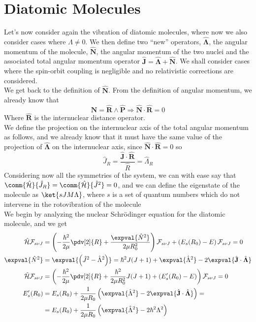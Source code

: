 \documentclass[a4paper, 11pt]{book}
\renewcommand{\vec}[1]{\mathbf{#1}}
\newcommand{\1}{\opr{\mathds{1}}}
\newcommand{\ham}{\mathcal{H}}
\newcommand{\opr}[1]{\hat{#1}}
\newcommand{\vecopr}[1]{\opr{\vec{#1}}}
\theoremstyle{plain}
\begin{document}
	\section{Diatomic Molecules}
	Let's now consider again the vibration of diatomic molecules, where now we also consider cases where $\Lambda\ne0$. We then define two ``new'' operators, $\vecopr{\Lambda}$, the angular momentum of the molecule, $\vecopr{N}$, the angular momentum of the two nuclei and the associated total angular momentum operator $\vecopr{J}=\vecopr{\Lambda}+\vecopr{N}$. We shall consider cases where the spin-orbit coupling is negligible and no relativistic corrections are considered.\\
	We get back to the definition of $\vecopr{N}$. From the definition of angular momentum, we already know that
	\begin{equation*}
		\vecopr{N}=\vecopr{R}\wedge\vecopr{P}\Longrightarrow\vecopr{N}\cdot\vecopr{R}=0
	\end{equation*}
	Where $\vecopr{R}$ is the internuclear distance operator.\\
	We define the projection on the internuclear axis of the total angular momentum as follows, and we already know that it must have the same value of the projection of $\vecopr{\Lambda}$ on the internuclear axis, since $\vecopr{N}\cdot\vecopr{R}=0$ so
	\begin{equation*}
		\opr{J}_R=\frac{\vecopr{J}\cdot\vecopr{R}}{\opr{R}}=\opr{\Lambda}_R
	\end{equation*}
	Considering now all the symmetries of the system, we can with ease say that $\comm{\opr{\ham}}{\opr{J}_R}=\comm{\opr{\ham}}{\opr{J}^2}=0$, and we can define the eigenstate of the molecule as $\ket{sJM\Lambda}$, where $s$ is a set of quantum numbers which do not intervene in the rotovibration of the molecule\\
	We begin by analyzing the nuclear Schrödinger equation for the diatomic molecule, and we get
	\begin{equation}
		\begin{aligned}
			\opr{\ham}\mathcal{F}_{s\nu J}&=\left( -\frac{\hbar^2}{2\mu}\pdv[2]{R}+\frac{\expval{\opr{N}^2}}{2\mu R_0^2} \right)\mathcal{F}_{s\nu J}+\left( E_s(R_0)-E \right)\mathcal{F}_{s\nu J}=0\\
			\expval{\opr{N}^2}&=\expval{\left( \opr{J}^2-\opr{\Lambda}^2 \right)}=\hbar^2J(J+1)+\expval{\opr{\Lambda}^2}-2\expval{\vecopr{J}\cdot\vecopr{\Lambda}}\\
			\opr{\ham}\mathcal{F}_{s\nu J}&=\left( -\frac{\hbar^2}{2\mu}\pdv[2]{R}+\frac{\hbar^2}{2\mu R_0^2}J(J+1)+(E_s'(R_0)-E) \right)\mathcal{F}_{s\nu J}=0\\
			E_s'(R_0)&=E_s(R_0)+\frac{1}{2\mu R_0}\left( \expval{\opr{\Lambda}^2}-2\expval{\vecopr{J}\cdot\vecopr{\Lambda}} \right)=\\
			&=E_s(R_0)+\frac{1}{2\mu R_0}\left( \expval{\opr{\Lambda}^2}-2\hbar^2\Lambda^2 \right)
		\end{aligned}
		\label{eq:nuclearschrodingerlambdane0}
	\end{equation}
\end{document}
